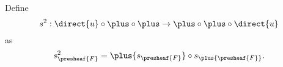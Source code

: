 \begin{definition}[$s^2$]
Define 
\[s^2: \direct{u} \circ \plus \circ \plus \rightarrow \plus \circ \plus \circ \direct{u}\]
as
\[s^2_{\presheaf{F}} = \plus{s_{\presheaf{F}}} \circ s_{\plus{\presheaf{F}}}.\]
\end{definition}